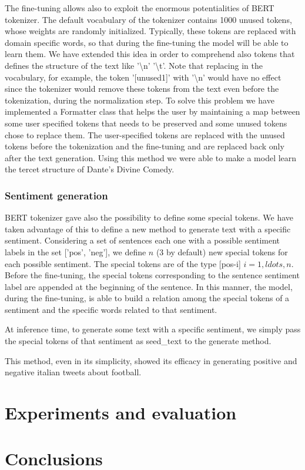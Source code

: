 \documentclass[10pt,twocolumn,letterpaper]{article}
\begin{document}
The fine-tuning allows also to exploit the enormous potentialities of BERT tokenizer.
The default vocabulary of the tokenizer contains 1000 unused tokens,
whose weights are randomly initialized.
Typically, these tokens are replaced with domain specific words,
so that during the fine-tuning the model will be able to learn them.
We have extended this idea in order to comprehend also tokens that defines
the structure of the text like '\textbackslash n' '\textbackslash t'.
Note that replacing in the vocabulary, for example, the token '[unused1]'
with '\textbackslash n' would have no effect since the tokenizer would
remove these tokens from the text even before the tokenization,
during the normalization step.
To solve this problem we have implemented a Formatter class that helps
the user by maintaining a map between some user specified tokens that needs
to be preserved and some unused tokens chose to replace them.
The user-specified tokens are replaced with the unused tokens before
the tokenization and the fine-tuning and are replaced back only after the
text generation.
Using this method we were able to make a model learn the tercet structure
of Dante's Divine Comedy.

\subsubsection{Sentiment generation}
BERT tokenizer gave also the possibility to define some special tokens.
We have taken advantage of this to define a new method to generate text
with a specific sentiment.
Considering a set of sentences each one with a possible sentiment labels
in the set ['pos', 'neg'], we define $n$ (3 by default) new special tokens
for each possible sentiment.
The special tokens are of the type [pos-i] $i=1,ldots,n$.
Before the fine-tuning, the special tokens corresponding to the sentence
sentiment label are appended at the beginning of the sentence.
In this manner, the model, during the fine-tuning, is able to build a
relation among the special tokens of a sentiment and the specific words
related to that sentiment.

At inference time, to generate some text with a specific sentiment,
we simply pass the special tokens of that sentiment as seed\_text to the
generate method.

This method, even in its simplicity, showed its efficacy in generating positive
and negative italian tweets about football.

\section{Experiments and evaluation}

\section{Conclusions}



\end{document}

